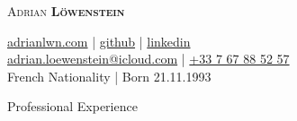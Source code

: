 \documentclass{article}
\newcommand{\namesection}[4]{
	\begin{center}
		\sffamily \color{headings}
		\headingfont\fontsize{35pt}{14pt}\selectfont\scshape #1 
			\headingfont\selectfont\scshape\bfseries #2
	\end{center}
	\vspace{-14pt}
		\begin{center} \color{subheadings}\normalfont\fontsize{11pt}{14pt}\selectfont #3
		\end{center}
	
	\vspace{-5pt}
	}
\begin{document}

\namesection{Adrian}{Löwenstein}{\href{https://www.adrianlwn.com}{\faGlobe{} adrianlwn.com} | \href{https://github.com/adrianlwn}{\faGithubSquare{}  github}  | \href{https://www.linkedin.com/in/adrianloewenstein}{\faLinkedinSquare{}  linkedin} \\ \href{mailto:adrian.loewenstein@icloud.com}{\faEnvelope{} adrian.loewenstein@icloud.com} |  \href{tel:+33767885257}{\faPhoneSquare{} +33 7 67 88 52 57}  \\ French Nationality | Born 21.11.1993}




\section{Professional Experience}
\end{document}
